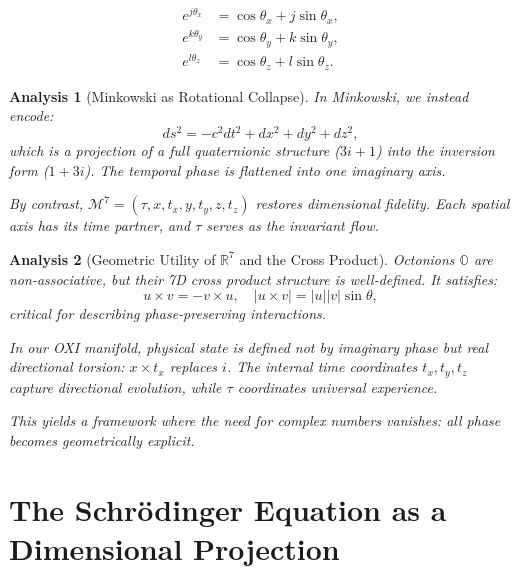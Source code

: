 \documentclass{article}
\newtheorem{analysis}{Analysis}
\begin{document}
\begin{align}
e^{j\theta_x} &= \cos\theta_x + j\sin\theta_x, \\
e^{k\theta_y} &= \cos\theta_y + k\sin\theta_y, \\
e^{l\theta_z} &= \cos\theta_z + l\sin\theta_z.
\end{align}

\begin{analysis}[Minkowski as Rotational Collapse]
In Minkowski, we instead encode:
\begin{equation}
ds^2 = -c^2dt^2 + dx^2 + dy^2 + dz^2,
\end{equation}
which is a projection of a full quaternionic structure (\( 3i + 1 \)) into the inversion form (\( 1 + 3i \)). The temporal phase is flattened into one imaginary axis.

By contrast, \( \mathcal{M}^7 = (\tau, x, t_x, y, t_y, z, t_z) \) restores dimensional fidelity. Each spatial axis has its time partner, and \( \tau \) serves as the invariant flow.
\end{analysis}

\begin{analysis}[Geometric Utility of \( \mathbb{R}^7 \) and the Cross Product]
Octonions \( \mathbb{O} \) are non-associative, but their 7D cross product structure is well-defined. It satisfies:
\begin{equation}
u \times v = -v \times u, \quad |u \times v| = |u||v|\sin\theta,
\end{equation}
critical for describing phase-preserving interactions.

In our OXI manifold, physical state is defined not by imaginary phase but real directional torsion: \( x \times t_x \) replaces \( i \). The internal time coordinates \( t_x, t_y, t_z \) capture directional evolution, while \( \tau \) coordinates universal experience.

This yields a framework where the need for complex numbers vanishes: all phase becomes geometrically explicit.
\end{analysis}




\section{The Schr\"odinger Equation as a Dimensional Projection}
\end{document}
